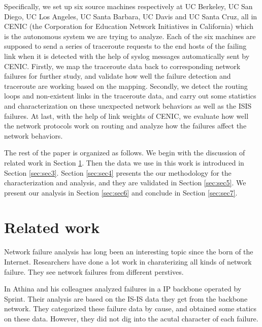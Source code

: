 \documentclass[conference, twocolumn, oneside, 10pt]{IEEEtran}
\begin{document}
Specifically, we set up six source machines respectively at UC Berkeley, UC San Diego, UC Los Angeles, UC Santa Barbara, UC Davis and UC Santa Cruz, all in CENIC (the Corporation for Education Network Initiatives in California) which is the autonomous system we are trying to analyze. Each of the six machines are supposed to send a series of traceroute requests to the end hosts of the failing link when it is detected with the help of syslog messages automatically sent by CENIC. Firstly, we map the traceroute data back to corresponding network failures for further study, and validate how well the failure detection and traceroute are working based on the mapping. Secondly, we detect the routing loops and non-existent links in the traceroute data, and carry out some statistics and characterization on these unexpected network behaviors as well as the ISIS failures. At last, with the help of link weights of CENIC, we evaluate how well the network protocols work on routing and analyze how the failures affect the network behaviors.

The rest of the paper is organized as follows. We begin with the discussion of related work in Section \ref{sec:sec2}. Then the data we use in this work is introduced in Section \ref{sec:sec3}. Section \ref{sec:sec4} presents the our methodology for the characterization and analysis, and they are validated in Section \ref{sec:sec5}. We present our analysis in Section \ref{sec:sec6} and conclude in Section \ref{sec:sec7}.

\section{Related work}
\label{sec:sec2}

Network failure analysis has long been an interesting topic since the born of
the Internet\cite{Baran_1964}. Researchers have done a lot work in charaterizing all kinds of network failure\cite{  Chandra:2008:CFA:1453175.1453178, Gill:2011:UNF:2018436.2018477, Markopoulou:2008:CFO:1453698.1453699, Shaikh:2002:CSO:637201.637236, turner2010california}. They see network failures from different perstives.

In \cite{Markopoulou:2008:CFO:1453698.1453699} Athina and his colleagues analyzed failures in a IP backbone operated by Sprint. Their analysis are based on the IS-IS data they get from the backbone network. They categorized these failure data by cause, and obtained some statics on these data. However, they did not dig into the acutal character of each failure.
\end{document}
